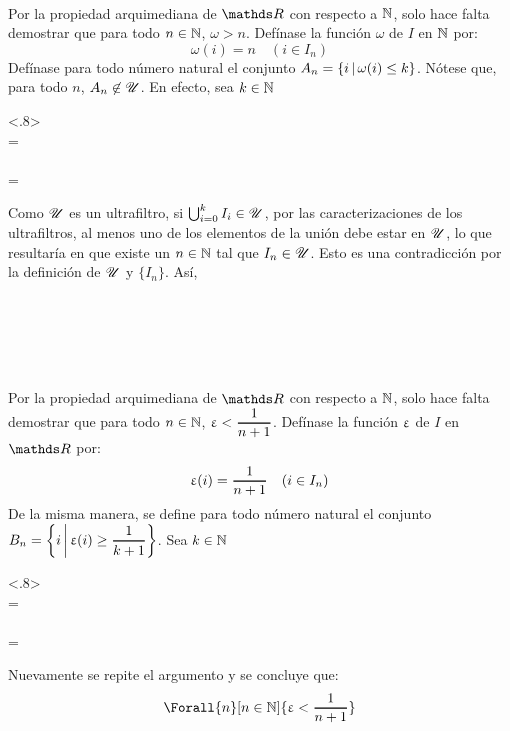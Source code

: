 \begin{demo}~
  \item Por la propiedad arquimediana de $\R$ con respecto a $\mathbb{N}$, solo hace falta
        demostrar que para todo $n\in\mathbb{N}$, $\omega > n$.
        Defínase la función $\omega$ de $I$ en $\mathbb{N}$ por:
        \[\omega(i) = n\quad (i\in I_n)\]
        Defínase para todo número natural el conjunto $A_n=\left\{i\,\middle|\,\omega(i)\leq k\right\}$.
        Nótese que, para todo $n$, $A_n\not\in\mathscr{U}$. En efecto, sea $k\in\mathbb{N}$
        \begin{longderivation}<.8>
            \\
          =\\
            \\
          =\\
        \end{longderivation}
        Como $\mathscr{U}$ es un ultrafiltro, si $\bigcup_{i=0}^k I_i\in\mathscr{U}$, por las
        caracterizaciones de los ultrafiltros, al menos uno de los
        elementos de la unión debe estar en $\mathscr{U}$, lo que resultaría en
        que existe un $n\in\mathbb{N}$ tal que $I_n\in\mathscr{U}$. Esto es una
        contradicción por la definición de $\mathscr{U}$ y $\{I_n\}$. Así,
        \begin{longderivation}
            \\
          \\
            \\
          \equiv\\
        \end{longderivation}
  \item Por la propiedad arquimediana de $\R$ con respecto a $\mathbb{N}$, solo
        hace falta demostrar que para todo
        $n\in\mathbb{N}$, $\e < \frac{1}{n+1}$. Defínase la función $\upvarepsilon$ de $I$
        en $\R$ por:
        \[\e(i)=\frac{1}{n+1} \quad (i\in I_n)\]
        De la misma manera, se define para todo número natural el
        conjunto $ B_n=\set{i}{\e(i)\geq \frac{1}{k+1}}$. Sea $k\in\mathbb{N}$
        \begin{longderivation}<.8>
            \\
          =\\
            \\
          =\\
        \end{longderivation}
        Nuevamente se repite el argumento y se concluye que:
        \[\Forall{n}[n\in\N]{\e < \frac{1}{n+1}}\]
\end{demo}

